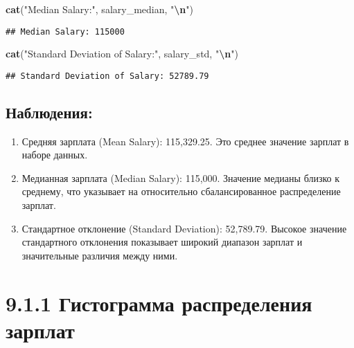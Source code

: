 \documentclass[
]{article}
\newenvironment{Shaded}{\begin{snugshade}}{\end{snugshade}}
\newcommand{\FunctionTok}[1]{\textcolor[rgb]{0.13,0.29,0.53}{\textbf{#1}}}
\newcommand{\NormalTok}[1]{#1}
\newcommand{\SpecialCharTok}[1]{\textcolor[rgb]{0.81,0.36,0.00}{\textbf{#1}}}
\newcommand{\StringTok}[1]{\textcolor[rgb]{0.31,0.60,0.02}{#1}}
\providecommand{\tightlist}{%
  \setlength{\itemsep}{0pt}\setlength{\parskip}{0pt}}
\begin{document}
\begin{Shaded}
\begin{Highlighting}[]
\FunctionTok{cat}\NormalTok{(}\StringTok{"Median Salary:"}\NormalTok{, salary\_median, }\StringTok{"}\SpecialCharTok{\textbackslash{}n}\StringTok{"}\NormalTok{)}
\end{Highlighting}
\end{Shaded}

\begin{verbatim}
## Median Salary: 115000
\end{verbatim}

\begin{Shaded}
\begin{Highlighting}[]
\FunctionTok{cat}\NormalTok{(}\StringTok{"Standard Deviation of Salary:"}\NormalTok{, salary\_std, }\StringTok{"}\SpecialCharTok{\textbackslash{}n}\StringTok{"}\NormalTok{)}
\end{Highlighting}
\end{Shaded}

\begin{verbatim}
## Standard Deviation of Salary: 52789.79
\end{verbatim}

\subsection{Наблюдения:}\label{ux43dux430ux431ux43bux44eux434ux435ux43dux438ux44f-6}

\begin{enumerate}
\def\labelenumi{\arabic{enumi}.}
\tightlist
\item
  Средняя зарплата (Mean Salary): 115,329.25. Это среднее значение
  зарплат в наборе данных.
\item
  Медианная зарплата (Median Salary): 115,000. Значение медианы близко к
  среднему, что указывает на относительно сбалансированное распределение
  зарплат.
\item
  Стандартное отклонение (Standard Deviation): 52,789.79. Высокое
  значение стандартного отклонения показывает широкий диапазон зарплат и
  значительные различия между ними.
\end{enumerate}

\section{9.1.1 Гистограмма распределения
зарплат}\label{ux433ux438ux441ux442ux43eux433ux440ux430ux43cux43cux430-ux440ux430ux441ux43fux440ux435ux434ux435ux43bux435ux43dux438ux44f-ux437ux430ux440ux43fux43bux430ux442}
\end{document}
